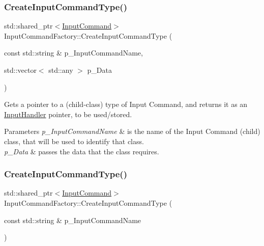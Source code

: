 \subsubsection{\texorpdfstring{CreateInputCommandType()}{CreateInputCommandType()}\hspace{0.1cm}{\footnotesize\ttfamily [1/2]}}
{\footnotesize\ttfamily std\+::shared\+\_\+ptr$<$\mbox{\hyperlink{class_input_command}{Input\+Command}}$>$ Input\+Command\+Factory\+::\+Create\+Input\+Command\+Type (\begin{DoxyParamCaption}\item[{const std\+::string \&}]{p\+\_\+\+Input\+Command\+Name,  }\item[{std\+::vector$<$ std\+::any $>$}]{p\+\_\+\+Data }\end{DoxyParamCaption})\hspace{0.3cm}{\ttfamily [inline]}}



Gets a pointer to a (child-\/class) type of Input Command, and returns it as an \mbox{\hyperlink{class_input_handler}{Input\+Handler}} pointer, to be used/stored. 


\begin{DoxyParams}{Parameters}
{\em p\+\_\+\+Input\+Command\+Name} & is the name of the Input Command (child) class, that will be used to identify that class. \\
\hline
{\em p\+\_\+\+Data} & passes the data that the class requires. \\
\hline
\end{DoxyParams}
\mbox{\label{class_input_command_factory_aa8d970f687c0392459ec1e596534c679}} 
\subsubsection{\texorpdfstring{CreateInputCommandType()}{CreateInputCommandType()}\hspace{0.1cm}{\footnotesize\ttfamily [2/2]}}
{\footnotesize\ttfamily std\+::shared\+\_\+ptr$<$\mbox{\hyperlink{class_input_command}{Input\+Command}}$>$ Input\+Command\+Factory\+::\+Create\+Input\+Command\+Type (\begin{DoxyParamCaption}\item[{const std\+::string \&}]{p\+\_\+\+Input\+Command\+Name }\end{DoxyParamCaption})\hspace{0.3cm}{\ttfamily [inline]}}



